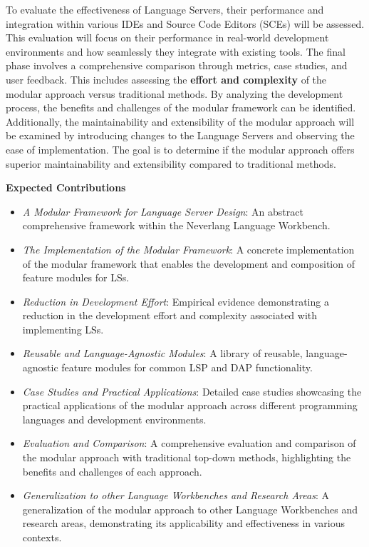 To evaluate the effectiveness of Language Servers, their performance and integration within various IDEs and Source Code Editors (SCEs) will be assessed. This evaluation will focus on their performance in real-world development environments and how seamlessly they integrate with existing tools. The final phase involves a comprehensive comparison through metrics, case studies, and user feedback. This includes assessing the \textbf{effort and complexity} of the modular approach versus traditional methods. By analyzing the development process, the benefits and challenges of the modular framework can be identified. Additionally, the maintainability and extensibility of the modular approach will be examined by introducing changes to the Language Servers and observing the ease of implementation. The goal is to determine if the modular approach offers superior maintainability and extensibility compared to traditional methods.

\hfill \break
\noindent
\textbf{Expected Contributions}

\begin{itemize}
    \item \textit{A Modular Framework for Language Server Design}: An abstract comprehensive framework within the Neverlang Language Workbench.
    \item \textit{The Implementation of the Modular Framework}: A concrete implementation of the modular framework that enables the development and composition of feature modules for LSs.
    \item \textit{Reduction in Development Effort}: Empirical evidence demonstrating a reduction in the development effort and complexity associated with implementing LSs.
    \item \textit{Reusable and Language-Agnostic Modules}: A library of reusable, language-agnostic feature modules for common LSP and DAP functionality.
    \item \textit{Case Studies and Practical Applications}: Detailed case studies showcasing the practical applications of the modular approach across different programming languages and development environments.
    \item \textit{Evaluation and Comparison}: A comprehensive evaluation and comparison of the modular approach with traditional top-down methods, highlighting the benefits and challenges of each approach.
    \item \textit{Generalization to other Language Workbenches and Research Areas}: A generalization of the modular approach to other Language Workbenches and research areas, demonstrating its applicability and effectiveness in various contexts.
\end{itemize}


